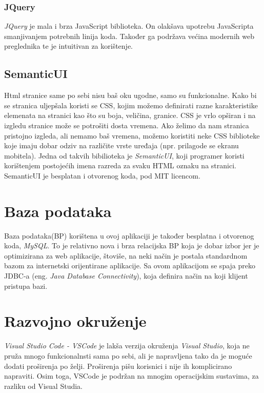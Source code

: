 \documentclass[zavrsni, numeric]{fer}
\begin{document}
\subsubsection{JQuery}
\textit{JQuery}\citep{jquery} je mala i brza JavaScript biblioteka. On olakšava upotrebu JavaScripta smanjivanjem potrebnih linija koda. Također ga podržava većina modernih web preglednika te je intuitivan za korištenje.

\subsection{SemanticUI}
Html stranice same po sebi nisu baš oku ugodne, samo su funkcionalne. Kako bi se stranica uljepšala koristi se CSS, kojim možemo definirati razne karakteristike elemenata na stranici kao što su boja, veličina, granice. CSS je vrlo opširan i na izgledu stranice može se potrošiti dosta vremena. Ako želimo da nam stranica pristojno izgleda, ali nemamo baš vremena, možemo koristiti neke CSS biblioteke koje imaju dobar odziv na različite vrste uređaja (npr. prilagode se ekranu mobitela). Jedna od takvih bibilioteka je \textit{SemanticUI}\citep{semantic}, koji programer koristi korištenjem postojećih imena razreda za svaku HTML oznaku na stranici. SemanticUI je besplatan i otvorenog koda, pod MIT licencom.

\section{Baza podataka}
Baza podataka(BP) korištena u ovoj aplikaciji je također besplatna i otvorenog koda, \textit{MySQL}\citep{mysql}. To je relativno nova i brza relacijska BP koja je dobar izbor jer je optimizirana za web aplikacije, štoviše, na neki način je postala standardnom bazom za internetski orijentirane aplikacije. Sa ovom aplikacijom se spaja preko JDBC-a (eng. \textit{Java Database Connectivity}), koja definira način na koji klijent pristupa bazi.

\section{Razvojno okruženje}
\textit{Visual Studio Code - VSCode}\citep{vscode} je lakša verzija okruženja \textit{Visual Studio}, koja ne pruža mnogo funkcionalnsti sama po sebi, ali je napravljena tako da je moguće dodati proširenja po želji. Proširenja pišu korisnici i nije ih komplicirano napraviti. Osim toga, VSCode je podržan na mnogim operacijskim sustavima, za razliku od Visual Studia.
\end{document}
